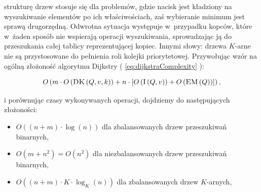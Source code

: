 strukturę drzew stosuje się dla problemów, gdzie nacisk jest kładziony na wyszukiwanie elementów po ich właściwościach, zaś wybieranie minimum jest sprawą drugorzędną. Odwrotna sytuacja występuje w~przypadku kopców, które w~żaden sposób nie wspierają operacji wyszukiwania, sprowadzając ją do przeszukania całej tablicy reprezentującej kopiec. Innymi słowy: drzewa $K$-arne nie są przystosowane do pełnienia roli kolejki priorytetowej. Przywołując wzór na ogólną złożoność algorytmu Dijkstry ( \ref{eq:dijkstraComplexity} ):

\begin{equation}
O \left( m \cdot O \left( \textrm{\textsc{DK}} \left( Q, v, k \right) \right) + n \cdot \left[ O \left( \textrm{\textsc{I}} \left( Q, v \right) \right) + O \left( \textrm{\textsc{EM}} \left( Q \right) \right) \right] \right)\textrm{,}
\end{equation}\label{eq:dijkstraComplexityShort}

i porównując czasy wykonywanych operacji, dojdziemy do następujących złożoności:

\begin{itemize}
\item $ O \left( \left( n + m \right) \cdot \log \left( n \right) \right)$  dla zbalansowanych drzew przeszukiwań binarnych,
\item $ O \left( m + n^{2} \right) = O \left( n^{2} \right) $ dla niezbalansowanych drzew przeszukiwań binarnych,
\item $ O \left( \left( n + m \right) \cdot K \cdot \log_{K} \left( n \right) \right)$  dla zbalansowanych drzew $K$-arnych,
\end{itemize}

